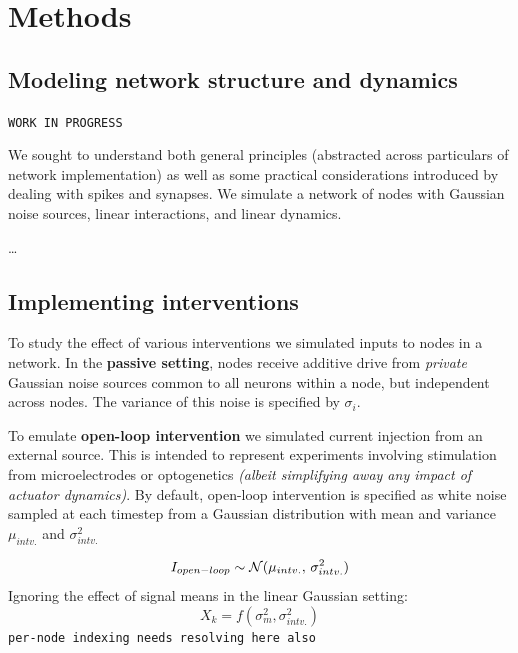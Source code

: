 \documentclass{article}
\begin{document}
\hypertarget{methods}{%
\section{Methods}\label{methods}}

\hypertarget{sec:methods-sim}{%
\subsection{Modeling network structure and dynamics}\label{sec:methods-sim}}

\texttt{WORK\ IN\ PROGRESS}

We sought to understand both general principles (abstracted across particulars of network implementation) as well as some practical considerations introduced by dealing with spikes and synapses. We simulate a network of nodes with Gaussian noise sources, linear interactions, and linear dynamics.

\ldots{}

\hypertarget{sec:methods-intervention}{%
\subsection{Implementing interventions}\label{sec:methods-intervention}}

To study the effect of various interventions we simulated inputs to nodes in a network. In the \textbf{passive setting}, nodes receive additive drive from \emph{private} Gaussian noise sources common to all neurons within a node, but independent across nodes. The variance of this noise is specified by \(\sigma_i\).

To emulate \textbf{open-loop intervention} we simulated current injection from an external source. This is intended to represent experiments involving stimulation from microelectrodes or optogenetics
\emph{(albeit simplifying away any impact of actuator dynamics)}. By default, open-loop intervention is specified as white noise sampled at each timestep from a Gaussian distribution with mean and variance
\(\mu_{intv.}\) and \(\sigma^2_{intv.}\)

\[
I_{open-loop} \sim \mathcal{N}(\mu_{intv.},\,\sigma^{2}_{intv.})\\
\] Ignoring the effect of signal means in the linear Gaussian setting:
\[
X_k = f(\sigma^2_m, \sigma^{2}_{intv.})
\] \texttt{per-node\ indexing\ needs\ resolving\ here\ also}
\end{document}
